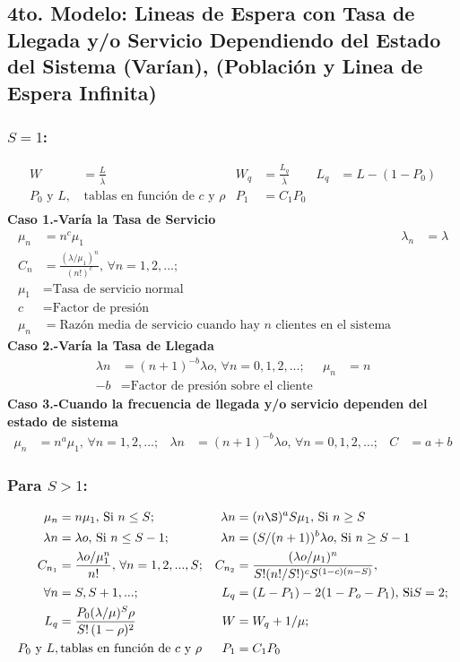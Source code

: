 \documentclass[letterpaper, 12pt]{article}
\begin{document}
\begin{justify}
    \subsection*{4to. Modelo: Lineas de Espera con Tasa de Llegada y/o Servicio Dependiendo del Estado del Sistema (Varían), (Población y Linea de Espera Infinita)}
    \subsubsection*{\(S=1\):}
    \large{
    \begin{align*}
W&=\frac{L}{\overline{\lambda}}&W_q&=\frac{L_q}{\overline{\lambda}}&L_q&=L-(1-P_0)\\
P_0 \text{ y } L,&\, \text{tablas en función de }c\text{ y }\rho&P_1&=C_1P_0\\
    \end{align*}
    }
    \textbf{Caso 1.-Varía la Tasa de Servicio}
    \large{
    \begin{align*}
\mu_n&=n^c\mu_1&\lambda_n&=\lambda\\
C_n&=\frac{(\lambda/\mu_1)^n}{(n!)^c},\,\forall n=1,2,...;& &\\
\mu_1&=\text{Tasa de servicio normal}& &\\
c&=\text{Factor de presión}& &\\
\mu_n&=\text{Razón media de servicio cuando hay } n\text{ clientes en el sistema}
    \end{align*}
    }
    \textbf{Caso 2.-Varía la Tasa de Llegada}
    \large{
    \begin{align*}
\lambda n&=(n+1)^{-b}\lambda o,\,\forall n=0,1,2,...;&\mu_n&=n\\
-b&=\text{Factor de presión sobre el cliente}
    \end{align*}
    }
    \textbf{Caso 3.-Cuando la frecuencia de llegada y/o servicio dependen del estado de sistema}
    \large{
    \begin{align*}
\mu_n&=n^a\mu_1,\,\forall n=1,2,...;&\lambda n&=(n+1)^{-b}\lambda o,\,\forall n=0,1,2,...;&C&=a+b
    \end{align*}
    }
    \subsubsection*{Para \(S>1\):}
    \large{
    \begin{align*}
\mu_n&=n\mu_1,\,\text{Si } n\leq S;&\lambda n&=(n\S)^aS\mu_1,\,\text{Si }n\geq S\\
\lambda n&=\lambda o,\,\text{Si }n\leq S-1;&\lambda n&=(S/(n+1))^b\lambda o,\,\text{Si }n\geq S-1\\
C_{n_1}&=\frac{\lambda o/\mu_1^n}{n!},\,\forall n=1,2,...,S;&C_{n_2}&=\frac{(\lambda o/\mu_1)^n}{S!(n!/S!)^cS^{(1-c)(n-S)}},\\
\forall n&=S,S+1,...;&L_q&=(L-P_1)-2(1-P_o-P_1),\,\text{Si} S=2;\\
L_q&=\frac{P_0(\lambda/\mu)^S\rho}{S!\,(1-\rho)^2}&W&=W_q+1/\mu;\\
P_0\text{ y }L,&\,\text{tablas en función de }c\text{ y }\rho&P_1&=C_1P_0
    \end{align*}
    }
\end{justify}
\end{document}
